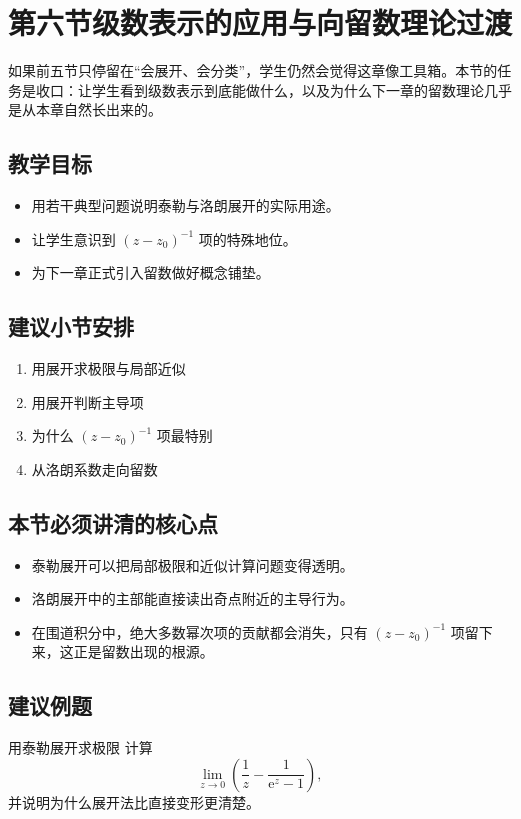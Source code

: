 \section{第六节\quad 级数表示的应用与向留数理论过渡}

\begin{wulibj}[本节要解决的问题]
如果前五节只停留在``会展开、会分类''，学生仍然会觉得这章像工具箱。本节的任务是收口：让学生看到级数表示到底能做什么，以及为什么下一章的留数理论几乎是从本章自然长出来的。
\end{wulibj}

\subsection*{教学目标}
\begin{itemize}
    \item 用若干典型问题说明泰勒与洛朗展开的实际用途。
    \item 让学生意识到 $(z-z_0)^{-1}$ 项的特殊地位。
    \item 为下一章正式引入留数做好概念铺垫。
\end{itemize}

\subsection*{建议小节安排}
\begin{enumerate}
    \item 用展开求极限与局部近似
    \item 用展开判断主导项
    \item 为什么 $(z-z_0)^{-1}$ 项最特别
    \item 从洛朗系数走向留数
\end{enumerate}

\subsection*{本节必须讲清的核心点}
\begin{itemize}
    \item 泰勒展开可以把局部极限和近似计算问题变得透明。
    \item 洛朗展开中的主部能直接读出奇点附近的主导行为。
    \item 在围道积分中，绝大多数幂次项的贡献都会消失，只有 $(z-z_0)^{-1}$ 项留下来，这正是留数出现的根源。
\end{itemize}

\subsection*{建议例题}
\begin{lizi}{用泰勒展开求极限}{}
计算
\[
    \lim_{z \to 0}\left(\frac{1}{z}-\frac{1}{\mathrm{e}^z-1}\right),
\]
并说明为什么展开法比直接变形更清楚。
\end{lizi}

